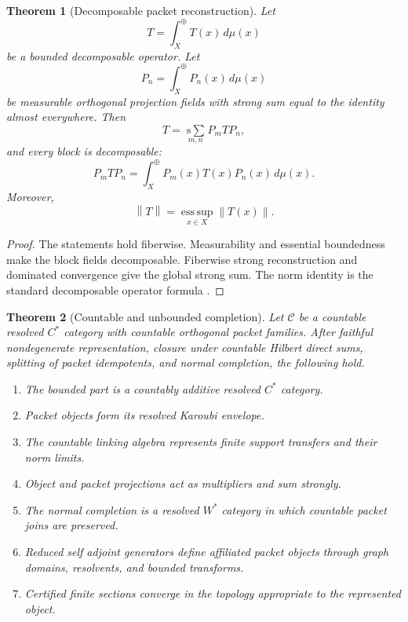 \documentclass{aomart}
\newtheorem{theorem}{Theorem}[section]
\theoremstyle{definition}
\theoremstyle{remark}
\newcommand{\Ccal}{\mathcal C}
\newcommand{\norm}[1]{\left\lVert#1\right\rVert}
\newcommand{\Rcite}[1]{\cite{#1}}
\begin{document}
\begin{theorem}[Decomposable packet reconstruction]\label{thm:decomposable_reconstruction}
Let
\[
 T=\int_X^{\oplus}T(x)\,d\mu(x)
\]
be a bounded decomposable operator. Let
\[
 P_n=\int_X^{\oplus}P_n(x)\,d\mu(x)
\]
be measurable orthogonal projection fields with strong sum equal to the identity almost everywhere. Then
\[
 \boxed{
 T
 =
 \operatorname*{s\!\!\sum}_{m,n}P_mTP_n,
 }
\]
and every block is decomposable:
\[
 P_mTP_n
 =
 \int_X^{\oplus}P_m(x)T(x)P_n(x)\,d\mu(x).
\]
Moreover,
\[
 \norm{T}
 =
 \operatorname*{ess\,sup}_{x\in X}\norm{T(x)}.
\]
\end{theorem}

\begin{proof}
The statements hold fiberwise. Measurability and essential boundedness make the block fields decomposable. Fiberwise strong reconstruction and dominated convergence give the global strong sum. The norm identity is the standard decomposable operator formula \Rcite{R8}.
\end{proof}

\begin{theorem}[Countable and unbounded completion]\label{thm:countable_completion}
Let \(\Ccal\) be a countable resolved \(C^*\) category with countable orthogonal packet families. After faithful nondegenerate representation, closure under countable Hilbert direct sums, splitting of packet idempotents, and normal completion, the following hold.
\begin{enumerate}
\item The bounded part is a countably additive resolved \(C^*\) category.
\item Packet objects form its resolved Karoubi envelope.
\item The countable linking algebra represents finite support transfers and their norm limits.
\item Object and packet projections act as multipliers and sum strongly.
\item The normal completion is a resolved \(W^*\) category in which countable packet joins are preserved.
\item Reduced self adjoint generators define affiliated packet objects through graph domains, resolvents, and bounded transforms.
\item Certified finite sections converge in the topology appropriate to the represented object.
\end{enumerate}
\end{theorem}
\end{document}
